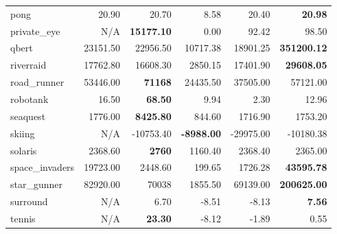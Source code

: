 \begin{center}
\begin{tabular}{l@{\hspace{.26cm}}r@{\hspace{.26cm}}r@{\hspace{.26cm}}r@{\hspace{.26cm}}r@{\hspace{.26cm}}r@{\hspace{.26cm}}}
        pong               &         20.90       &         20.70       &         8.58                      &         20.40            & \textbf{20.98}        \\
        private\_eye       &         N/A         & \textbf{15177.10}   &         0.00                      &         92.42            &         98.50         \\
        qbert              &         23151.50    &         22956.50    &         10717.38                  &         18901.25         & \textbf{351200.12}    \\
        riverraid          &         17762.80    &         16608.30    &         2850.15                   &         17401.90         & \textbf{29608.05}     \\
        road\_runner       &         53446.00    & \textbf{71168}      &         24435.50                  &         37505.00         &         57121.00      \\
        robotank           &         16.50       & \textbf{68.50}      &         9.94                      &         2.30             &         12.96         \\
        seaquest           &         1776.00     & \textbf{8425.80}    &         844.60                    &         1716.90          &         1753.20       \\
        skiing             &         N/A         &         -10753.40   & \textbf{-8988.00}                 &         -29975.00        &         -10180.38     \\
        solaris            &         2368.60     & \textbf{2760}       &         1160.40                   &         2368.40          &         2365.00       \\
        space\_invaders    &         19723.00    &         2448.60     &         199.65                    &         1726.28          & \textbf{43595.78}     \\
        star\_gunner       &         82920.00    &         70038       &         1855.50                   &         69139.00         & \textbf{200625.00}    \\
        surround           &         N/A         &         6.70        &         -8.51                     &         -8.13            & \textbf{7.56}         \\
        tennis             &         N/A         & \textbf{23.30}      &         -8.12                     &         -1.89            &         0.55          \\

\end{tabular}
\end{center}
